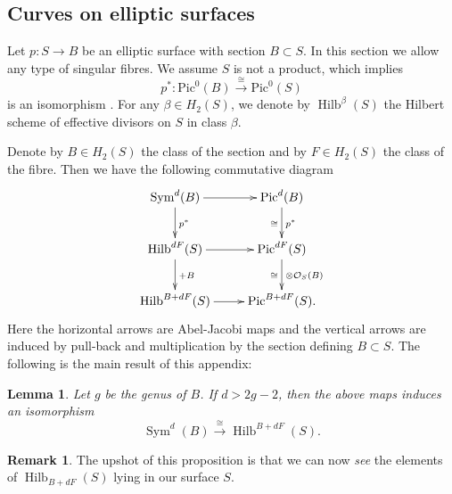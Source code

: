 \documentclass{amsart}
\newtheorem{lemma}[theorem]{Lemma}
\theoremstyle{definition}
\newtheorem{remark}[theorem]{Remark}
\renewcommand{\O}{\mathcal{O}}
\newcommand{\Pic}{\mathrm{Pic}}
\newcommand{\Sym}{\operatorname{Sym}}
\newcommand{\Hilb}{\operatorname{Hilb}}
\begin{document}
\subsection{Curves on elliptic surfaces}\label{appHilb}

Let $p : S \rightarrow B$ be an elliptic surface with section $B \subset S$. In this section we allow any type of singular fibres. We assume $S$ is not a product, which implies
$$
p^* : \Pic^0(B) \stackrel{\cong}{\longrightarrow} \Pic^0(S)
$$
is an isomorphism \cite[VII.1.1]{Mir}. For any $\beta \in H_2(S)$, we denote by $\Hilb^\beta(S)$ the Hilbert scheme of effective divisors on $S$ in class $\beta$. 

Denote by $B \in H_2(S)$ the class of the section and by $F \in H_2(S)$ the class of the fibre. Then we have the following commutative diagram 
\begin{displaymath}
\xymatrix
{
\Sym^d(B) \ar[d]^{p^*} \ar[r] & \Pic^d(B) \ar[d]^{p^*}_{\cong} \\
\Hilb^{dF}(S) \ar[d]^{+B} \ar[r] & \Pic^{dF}(S) \ar[d]^{\otimes \O_S(B)}_{\cong} \\
\Hilb^{B+dF}(S) \ar[r] & \Pic^{B+dF}(S). 
}
\end{displaymath}
Here the horizontal arrows are Abel-Jacobi maps and the vertical arrows are induced by pull-back and multiplication by the section defining $B \subset S$. The following is the main result of this appendix:
\begin{lemma} \label{Hilbcvs}
Let $g$ be the genus of $B$. If $d > 2g - 2$, then the above maps induces an isomorphism
$$
\Sym^d(B) \stackrel{\cong}{\longrightarrow} \Hilb^{B+dF}(S).
$$
\end{lemma}

\begin{remark}
The upshot of this proposition is that we can now \emph{see} the elements of $\Hilb_{B+dF}(S)$ lying in our surface $S$.
\end{remark}
\end{document}
